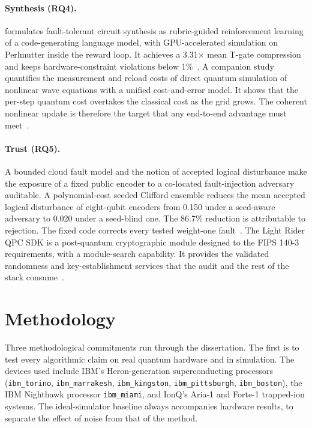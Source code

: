 \paragraph{Synthesis (RQ4).}
\rubriq{} formulates fault-tolerant circuit synthesis as rubric-guided reinforcement learning of a code-generating language model, with GPU-accelerated simulation on Perlmutter inside the reward loop. It achieves a 3.31$\times$ mean T-gate compression and keeps hardware-constraint violations below 1\%~\cite{guo2026rubriq}. A companion study quantifies the measurement and reload costs of direct quantum simulation of nonlinear wave equations with a unified cost-and-error model. It shows that the per-step quantum cost overtakes the classical cost as the grid grows. The coherent nonlinear update is therefore the target that any end-to-end advantage must meet~\cite{guo2026nonlinearwaves}.

\paragraph{Trust (RQ5).}
A bounded cloud fault model and the notion of accepted logical disturbance make the exposure of a fixed public encoder to a co-located fault-injection adversary auditable. A polynomial-cost seeded Clifford ensemble reduces the mean accepted logical disturbance of eight-qubit encoders from 0.150 under a seed-aware adversary to 0.020 under a seed-blind one. The 86.7\% reduction is attributable to rejection. The fixed  code corrects every tested weight-one fault~\cite{guo2026qecaudit}. The Light Rider QPC SDK is a post-quantum cryptographic module designed to the FIPS 140-3 requirements, with a module-search capability. It provides the validated randomness and key-establishment services that the audit and the rest of the stack consume~\cite{guo2026lightriderqpc}.


\section{Methodology}\label{sec:intro:method}

Three methodological commitments run through the dissertation. The first is to test every algorithmic claim on real quantum hardware and in simulation. The devices used include IBM's Heron-generation superconducting processors (\texttt{ibm\_torino}, \texttt{ibm\_marrakesh}, \texttt{ibm\_kingston}, \texttt{ibm\_pittsburgh}, \texttt{ibm\_boston}), the IBM Nighthawk processor \texttt{ibm\_miami}, and IonQ's Aria-1 and Forte-1 trapped-ion systems. The ideal-simulator baseline always accompanies hardware results, to separate the effect of noise from that of the method.

